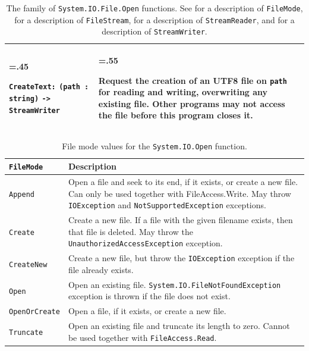 \documentclass[fsharpNotes.tex]{subfiles}
\begin{document}
\begin{table}
\begin{center}
\begin{tabularx}{\linewidth}{|>{\hsize=.45\hsize\raggedright\arraybackslash}X|>{\hsize=.55\hsize\raggedright\arraybackslash}X|}
      \hline
      \lstinline{CreateText:} \mbox{\lstinline{(path : string)}} \mbox{\lstinline{-> StreamWriter}} & Request the creation of an UTF8 file on \lstinline{path} for reading and writing, overwriting any existing file. Other programs may not access the file before this program closes it.\\
      \hline
    \end{tabularx}
  \end{center}
  \caption{The family of \lstinline!System.IO.File.Open! functions. See  for a description of \lstinline{FileMode},  for a description of \lstinline{FileStream},  for a description of \lstinline{StreamReader}, and  for a description of \lstinline{StreamWriter}.}
  \label{tab:File.Open}
\end{table}%
%
%
%
%
%
%
\begin{table}
  \centering
  \begin{tabularx}{\linewidth}{|l|X|}
    \hline
    \rowcolor{headerRowColor} \lstinline{FileMode} & Description\\
    \hline
    \lstinline{Append} & Open a file and seek to its end, if it exists, or create a new file. Can only be used together with FileAccess.Write. May throw \mbox{\lstinline{IOException}} and \mbox{\lstinline{NotSupportedException}} exceptions.\\
    \hline
    \lstinline{Create} & Create a new file. If a file with the given filename exists, then that file is deleted. May throw the \mbox{\lstinline{UnauthorizedAccessException}} exception.\\
    \hline
    \lstinline{CreateNew} & Create a new file, but throw the \mbox{\lstinline{IOException}} exception if the file already exists.\\
    \hline
    \lstinline{Open} & Open an existing file. \mbox{\lstinline{System.IO.FileNotFoundException}} exception is thrown if the file does not exist.\\
    \hline
    \lstinline{OpenOrCreate} & Open a file, if it exists, or create a new file.\\
    \hline
    \lstinline{Truncate} & Open an existing file and truncate its length to zero. Cannot be used together with \mbox{\lstinline{FileAccess.Read}}.\\
    \hline
  \end{tabularx}
  \caption{File mode values for the \lstinline!System.IO.Open! function.}
  \label{tab:fileMode}
\end{table}
\end{document}
